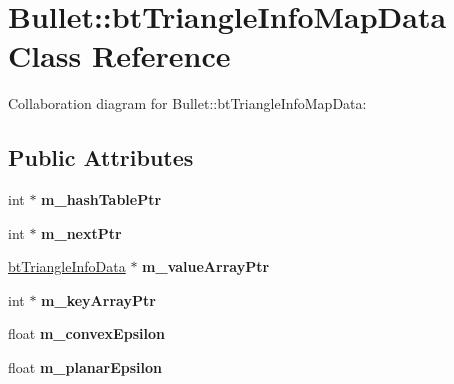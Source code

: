 \hypertarget{class_bullet_1_1bt_triangle_info_map_data}{\section{Bullet\+:\+:bt\+Triangle\+Info\+Map\+Data Class Reference}
\label{class_bullet_1_1bt_triangle_info_map_data}
}


Collaboration diagram for Bullet\+:\+:bt\+Triangle\+Info\+Map\+Data\+:
\subsection*{Public Attributes}
\begin{DoxyCompactItemize}
\item 
\hypertarget{class_bullet_1_1bt_triangle_info_map_data_ac182d40e3df7dd779d27eebcf17923cd}{int $\ast$ {\bfseries m\+\_\+hash\+Table\+Ptr}}\label{class_bullet_1_1bt_triangle_info_map_data_ac182d40e3df7dd779d27eebcf17923cd}

\item 
\hypertarget{class_bullet_1_1bt_triangle_info_map_data_a737b11f3804371b824c9966273ae6a55}{int $\ast$ {\bfseries m\+\_\+next\+Ptr}}\label{class_bullet_1_1bt_triangle_info_map_data_a737b11f3804371b824c9966273ae6a55}

\item 
\hypertarget{class_bullet_1_1bt_triangle_info_map_data_ad3c4927a20cf9952bd9918d1c4f1bbab}{\hyperlink{class_bullet_1_1bt_triangle_info_data}{bt\+Triangle\+Info\+Data} $\ast$ {\bfseries m\+\_\+value\+Array\+Ptr}}\label{class_bullet_1_1bt_triangle_info_map_data_ad3c4927a20cf9952bd9918d1c4f1bbab}

\item 
\hypertarget{class_bullet_1_1bt_triangle_info_map_data_a48636c44bf384f0f4fb1bf0201b25af2}{int $\ast$ {\bfseries m\+\_\+key\+Array\+Ptr}}\label{class_bullet_1_1bt_triangle_info_map_data_a48636c44bf384f0f4fb1bf0201b25af2}

\item 
\hypertarget{class_bullet_1_1bt_triangle_info_map_data_a71ac31ddedb82f6ed7e16ff08b2d34cc}{float {\bfseries m\+\_\+convex\+Epsilon}}\label{class_bullet_1_1bt_triangle_info_map_data_a71ac31ddedb82f6ed7e16ff08b2d34cc}

\item 
\hypertarget{class_bullet_1_1bt_triangle_info_map_data_aa165bc8847faa5f721fc322f300a350f}{float {\bfseries m\+\_\+planar\+Epsilon}}\label{class_bullet_1_1bt_triangle_info_map_data_aa165bc8847faa5f721fc322f300a350f}


\end{DoxyCompactItemize}
